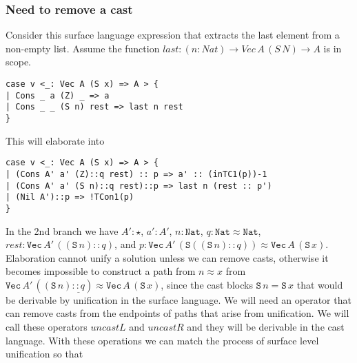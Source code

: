 

\subsubsection{Need to remove a cast}

Consider this surface language expression that extracts the last element from a non-empty list.
Assume the function $last:(n:Nat)\rightarrow Vec\,A\,(S\,N)\rightarrow A$ is in scope.

\begin{lstlisting}[basicstyle={\ttfamily\small}]
case v <_: Vec A (S x) => A > {
| Cons _ a (Z) _ => a
| Cons _ _ (S n) rest => last n rest
}
\end{lstlisting}

This will elaborate into 

\begin{lstlisting}[basicstyle={\ttfamily\small}]
case v <_: Vec A (S x) => A > {
| (Cons A' a' (Z)::q rest) :: p => a' :: (inTC1(p))-1
| (Cons A' a' (S n)::q rest)::p => last n (rest :: p')
| (Nil A')::p => !TCon1(p)
}
\end{lstlisting}


In the 2nd branch we have
  $A':\star$, $a':A'$, $n:\mathtt{Nat}$,
  $q:\mathtt{Nat}\approx \mathtt{Nat}$,
  $rest:\mathtt{Vec}\,A'\,\left(\left(\mathtt{S}\,n\right)::q\right)$,
  and $p:\mathtt{Vec}\,A'\,\left(\mathtt{S}\left(\left(\mathtt{S}\,n\right)::q\right)\right)\approx \mathtt{Vec}\,A\,\left(\mathtt{S}\,x\right)$.
Elaboration cannot unify a solution unless we can remove casts, otherwise it becomes impossible to construct a path from $n \approx x$
  from $\mathtt{Vec}\,A'\,\left(\left(\mathtt{S}\,n\right)\underline{::q}\right)\approx \mathtt{Vec}\,A\,\left(\mathtt{S}\,x\right)$, since the cast blocks
  $\mathtt{S}\,n = \mathtt{S}\,x$ that would be derivable by unification in the surface language.
We will need an operator that can remove casts from the endpoints of paths that arise from unification.
We will call these operators $uncastL$ and $uncastR$ and they will be derivable in the cast language.
With these operations we can match the process of surface level unification so that

